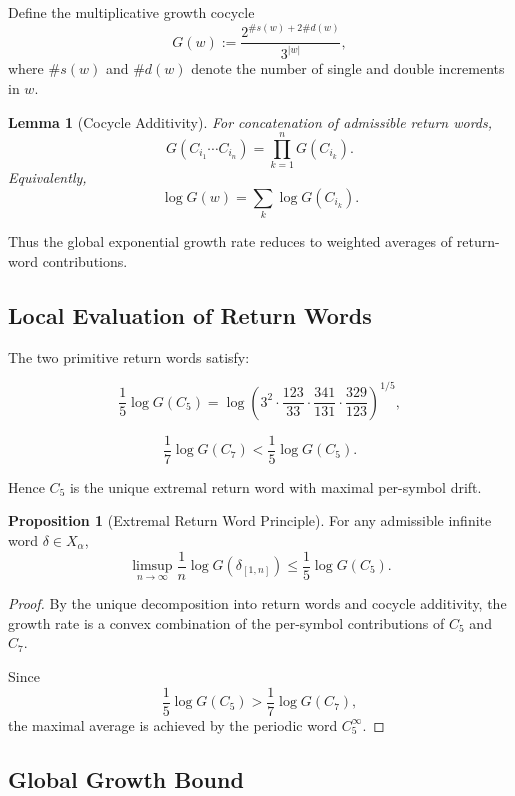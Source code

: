 \documentclass[12pt, oneside]{article}
\numberwithin{equation}{section}
\theoremstyle{definition}
\newtheorem{proposition}{Proposition}[section]
\theoremstyle{plain}
\newtheorem{lemma}[theorem]{Lemma}
\theoremstyle{remark}
\begin{document}
Define the multiplicative growth cocycle
\[
G(w) := \frac{2^{\#s(w) + 2\#d(w)}}{3^{|w|}},
\]
where $\#s(w)$ and $\#d(w)$ denote the number of single and double increments in $w$.

\begin{lemma}[Cocycle Additivity]
For concatenation of admissible return words,
\[
G(C_{i_1} \cdots C_{i_n}) = \prod_{k=1}^n G(C_{i_k}).
\]
Equivalently,
\[
\log G(w) = \sum_{k} \log G(C_{i_k}).
\]
\end{lemma}

Thus the global exponential growth rate reduces to weighted averages
of return-word contributions.


\subsection{Local Evaluation of Return Words}

The two primitive return words satisfy:

\[
\frac{1}{5}\log G(C_5)
=
\log\!\left(
3^{2}
\cdot \frac{123}{33}
\cdot \frac{341}{131}
\cdot \frac{329}{123}
\right)^{1/5},
\]

\[
\frac{1}{7}\log G(C_7)
<
\frac{1}{5}\log G(C_5).
\]

Hence $C_5$ is the unique extremal return word with maximal per-symbol drift.

\begin{proposition}[Extremal Return Word Principle]
For any admissible infinite word $\delta \in X_\alpha$,
\[
\limsup_{n\to\infty}
\frac{1}{n} \log G(\delta_{[1,n]})
\le
\frac{1}{5}\log G(C_5).
\]
\end{proposition}

\begin{proof}
By the unique decomposition into return words and cocycle additivity,
the growth rate is a convex combination of the per-symbol contributions
of $C_5$ and $C_7$.

Since
\[
\frac{1}{5}\log G(C_5)
>
\frac{1}{7}\log G(C_7),
\]
the maximal average is achieved by the periodic word $C_5^\infty$.
\end{proof}


\subsection{Global Growth Bound}
\end{document}
